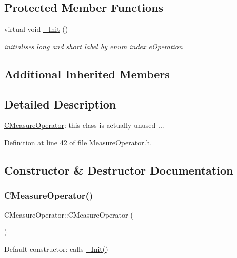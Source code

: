 \subsection*{Protected Member Functions}
\begin{DoxyCompactItemize}
\item 
virtual void \hyperlink{classCMeasureOperator_aa0d73fc93150362e4c7617f9ddb5e722}{\+\_\+\+Init} ()
\begin{DoxyCompactList}\small\item\em initialises long and short label by enum index e\+Operation \end{DoxyCompactList}\end{DoxyCompactItemize}
\subsection*{Additional Inherited Members}


\subsection{Detailed Description}
\hyperlink{classCMeasureOperator}{C\+Measure\+Operator}\+: this class is actually unused ... 

Definition at line 42 of file Measure\+Operator.\+h.



\subsection{Constructor \& Destructor Documentation}
\mbox{\label{classCMeasureOperator_abdf6e7568d2d9c5313299ff6b7a6012e}} 
\subsubsection{\texorpdfstring{C\+Measure\+Operator()}{CMeasureOperator()}}
{\footnotesize\ttfamily C\+Measure\+Operator\+::\+C\+Measure\+Operator (\begin{DoxyParamCaption}{ }\end{DoxyParamCaption})}

Default constructor\+: calls \hyperlink{classCMeasureOperator_aa0d73fc93150362e4c7617f9ddb5e722}{\+\_\+\+Init()} 

